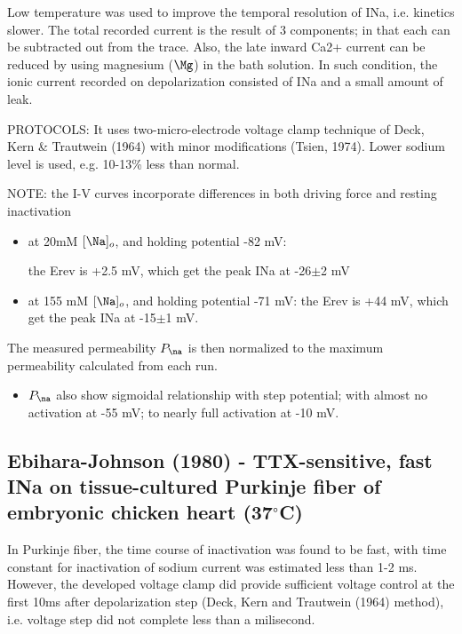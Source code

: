 Low temperature was used to improve the temporal resolution of INa, i.e.
kinetics slower. The total recorded current is the result of 3 components; in
that each can be subtracted out from the trace. Also, the late inward Ca2+
current can be reduced by using magnesium ($\Mg$) in the bath solution.
In such condition, the ionic current recorded on depolarization consisted of INa
and a small amount of leak.

PROTOCOLS: It uses two-micro-electrode voltage clamp technique of Deck, Kern \&
Trautwein (1964) with minor modifications (Tsien, 1974).
Lower sodium level is used, e.g. 10-13\% less than normal. 

NOTE: the I-V curves incorporate differences in both driving force and resting
inactivation
\begin{itemize}
  \item at 20mM $[\Na]_o$, and holding potential -82 mV: 
  
  
  the Erev is +2.5 mV, which get the peak INa at -26$\pm$2 mV
  
  \item at 155 mM $[\Na]_o$, and holding potential -71 mV: the Erev is +44 mV,
  which get the peak INa at -15$\pm$1 mV.
  
\end{itemize}

The measured permeability $P_\na$ is then normalized to the maximum permeability
calculated from each run.
\begin{itemize}
  \item $P_\na$ also show sigmoidal relationship with step potential;
  with almost no activation at -55 mV; to nearly full activation at -10 mV.  
\end{itemize}


\subsection{Ebihara-Johnson (1980) - TTX-sensitive, fast INa on
tissue-cultured Purkinje fiber of embryonic chicken heart (37$^\circ$C)}
\label{sec:Ina_E-J-model}

In Purkinje fiber, the time course of inactivation was found to be fast, with
time constant for inactivation of sodium current was estimated less than 1-2 ms.
However, the developed voltage clamp did provide sufficient voltage control at
the first 10ms after depolarization step (Deck, Kern and Trautwein (1964)
method), i.e. voltage step did not complete less than a milisecond. 

